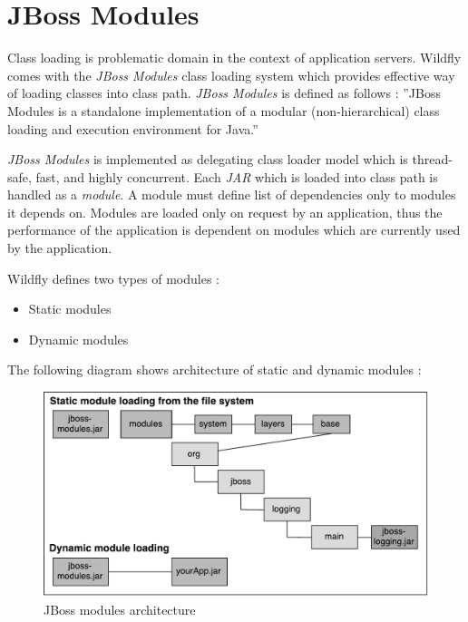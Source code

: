 \documentclass[12pt,oneside]{fithesis2}
\begin{document}
\section{JBoss Modules}
\label{jboss_modules_sec}
Class loading is problematic domain in the context of application servers. Wildfly comes with the \textit{JBoss Modules} class loading system which provides effective way of loading classes into class path. \textit{JBoss Modules} is defined as follows \cite[Introduction]{jboss_modules_doc}: ''JBoss Modules is a standalone implementation of a modular (non-hierarchical) class loading and execution environment for Java.''

\textit{JBoss Modules} is implemented as delegating class loader model which is thread-safe, fast, and highly concurrent. Each \textit{JAR} which is loaded into class path is handled as a \textit{module}. A module must define list of dependencies only to modules it depends on. Modules are loaded only on request by an application, thus the performance of the application is dependent on modules which are currently used by the application.

Wildfly defines two types of modules \cite{wildfly_book}:

\begin{itemize}
	\item Static modules
	\item Dynamic modules
\end{itemize}

The following diagram shows architecture of static and dynamic modules \cite{wildfly_book}:

\begin{figure}[ht!]
	\centering
	\includegraphics[width=\textwidth]{images/jboss_modules}
	\caption{JBoss modules architecture}
	\label{jboss_modules_image}
\end{figure}
\end{document}

